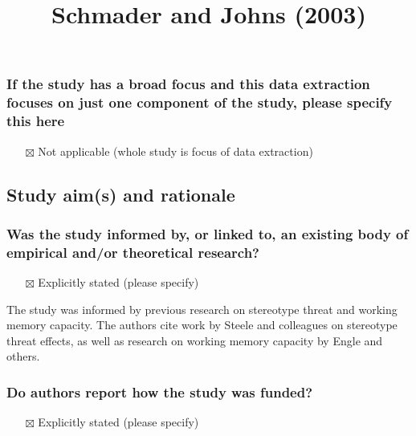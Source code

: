 \documentclass[
  doc, a4paper]{apa7}
\title{Schmader and Johns (2003)}
\author{\phantom{0}}
\date{}
\affiliation{\phantom{0}}
\providecommand{\tightlist}{%
  \setlength{\itemsep}{0pt}\setlength{\parskip}{0pt}}
\begin{document}
\maketitle

\subsubsection{If the study has a broad focus and this data extraction focuses on just one component of the study, please specify this here}\label{if-the-study-has-a-broad-focus-and-this-data-extraction-focuses-on-just-one-component-of-the-study-please-specify-this-here}

\begin{itemize}
\tightlist
\item[$\boxtimes$]
  Not applicable (whole study is focus of data extraction)
\end{itemize}

\subsection{Study aim(s) and rationale}\label{study-aims-and-rationale}

\subsubsection{Was the study informed by, or linked to, an existing body of empirical and/or theoretical research?}\label{was-the-study-informed-by-or-linked-to-an-existing-body-of-empirical-andor-theoretical-research}

\begin{itemize}
\tightlist
\item[$\boxtimes$]
  Explicitly stated (please specify)
\end{itemize}

The study was informed by previous research on stereotype threat and working memory capacity. The authors cite work by Steele and colleagues on stereotype threat effects, as well as research on working memory capacity by Engle and others.

\subsubsection{Do authors report how the study was funded?}\label{do-authors-report-how-the-study-was-funded}

\begin{itemize}
\tightlist
\item[$\boxtimes$]
  Explicitly stated (please specify)
\end{itemize}
\end{document}
